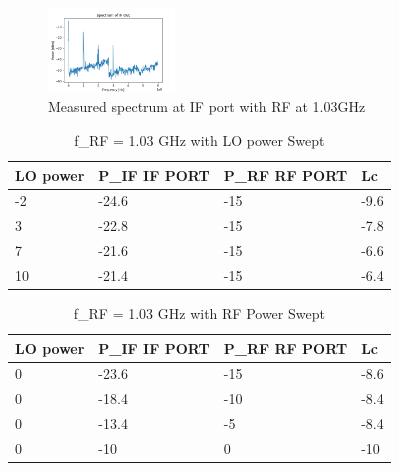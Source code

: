 \documentclass[journal]{IEEEtran}
\begin{document}
\begin{figure}[hp]
    \centering
    \includegraphics[width=0.3\textwidth]{spectrum_cv.png}
    \caption{\label{fig:spectrum_cv} Measured spectrum at IF port with RF at 1.03GHz}
\end{figure}

\begin{table}[hp]
    \centering
    \begin{tabular}{llll}
        \toprule
        LO power & P\_IF IF PORT & P\_RF RF PORT & Lc   \\ \midrule
        -2       & -24.6         & -15           & -9.6 \\\midrule
        3        & -22.8         & -15           & -7.8 \\\midrule
        7        & -21.6         & -15           & -6.6 \\\midrule
        10       & -21.4         & -15           & -6.4 \\ \bottomrule
    \end{tabular}
    \vspace{1em}
    \caption{f\_RF = 1.03 GHz with LO power Swept}
    \label{tab:lo_sweep}
\end{table}
\begin{table}[hp]
    \centering
    \begin{tabular}{llll}
        \toprule
        LO power & P\_IF IF PORT & P\_RF RF PORT & Lc   \\\midrule
        0        & -23.6         & -15           & -8.6 \\\midrule
        0        & -18.4         & -10           & -8.4 \\\midrule
        0        & -13.4         & -5            & -8.4 \\ \midrule
        0        & -10           & 0             & -10  \\ \bottomrule
    \end{tabular}
    \vspace{1em}
    \caption{f\_RF = 1.03 GHz with RF Power Swept}
    \label{tab:rf_sweep}
\end{table}
\end{document}
